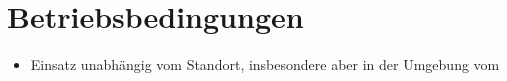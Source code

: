 \section{Betriebsbedingungen}

\begin{itemize}
	\item Einsatz unabhängig vom Standort, insbesondere aber in der Umgebung vom %
\end{itemize}